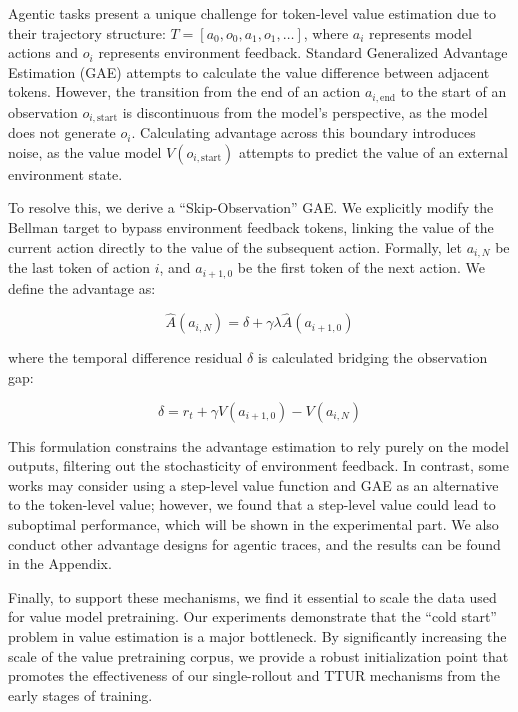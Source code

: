 Agentic tasks present a unique challenge for token-level value estimation due to their trajectory structure: $T = [a_0, o_0, a_1, o_1, \dots]$, where $a_i$ represents model actions and $o_i$ represents environment feedback. Standard Generalized Advantage Estimation (GAE) attempts to calculate the value difference between adjacent tokens. However, the transition from the end of an action $a_{i, \text{end}}$ to the start of an observation $o_{i, \text{start}}$ is discontinuous from the model's perspective, as the model does not generate $o_i$.
Calculating advantage across this boundary introduces noise, as the value model $V(o_{i, \text{start}})$ attempts to predict the value of an external environment state.

To resolve this, we derive a ``Skip-Observation'' GAE. We explicitly modify the Bellman target to bypass environment feedback tokens, linking the value of the current action directly to the value of the subsequent action.
Formally, let $a_{i, N}$ be the last token of action $i$, and $a_{i+1, 0}$ be the first token of the next action. We define the advantage as:

\begin{equation}
    \hat{A}(a_{i, N}) = \delta + \gamma \lambda \hat{A}(a_{i+1, 0})
\end{equation}

where the temporal difference residual $\delta$ is calculated bridging the observation gap:

\begin{equation}
    \delta = r_t + \gamma V(a_{i+1, 0}) - V(a_{i, N})
\end{equation}

This formulation constrains the advantage estimation to rely purely on the model outputs, filtering out the stochasticity of environment feedback. In contrast, some works may consider using a step-level value function and GAE as an alternative to the token-level value; however, we found that a step-level value could lead to suboptimal performance, which will be shown in the experimental part.
We also conduct other advantage designs for agentic traces, and the results can be found in the Appendix. 

Finally, to support these mechanisms, we find it essential to scale the data used for value model pretraining. Our experiments demonstrate that the ``cold start'' problem in value estimation is a major bottleneck. By significantly increasing the scale of the value pretraining corpus, we provide a robust initialization point that promotes the effectiveness of our single-rollout and TTUR mechanisms from the early stages of training.


